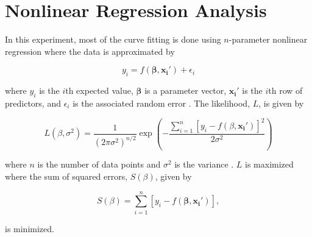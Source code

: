 
\section{Nonlinear Regression Analysis}\label{nonlinearregressionanalysis}
In this experiment, most of the curve fitting is done using $n$-parameter nonlinear regression where the data is approximated by

\begin{equation}
\label{nonlinfit}
y_{i}=f(\mathbf{\beta},\mathbf{x_{i}'})+\epsilon_{i}
\end{equation}

where $y_{i}$ is the $i$th expected value, $\mathbf{\beta}$ is a parameter vector, $\mathbf{x_{i}'}$ is the $i$th row of predictors, and $\epsilon_{i}$ is the associated random error \cite{bates}.  The likelihood, $L$, is given by 

\begin{equation}
\label{likelihood}
L(\beta,\sigma^{2})=\frac{1}{(2\pi\sigma^{2})^{n/2}}\exp(-\frac{\sum_{i=1}^{n}[y_{i}-f(\beta,\mathbf{x_{i}'})]^{2}}{2\sigma^{2}})
\end{equation}

where $n$ is the number of data points and $\sigma^{2}$ is the variance \cite{bates}. $L$ is maximized where the sum of squared errors, $S(\beta)$, given by \cite{bates}

\begin{equation}
\label{sse}
S(\beta) = \sum_{i=1}^{n}[y_{i}-f(\mathbf{\beta},\mathbf{x_{i}'})],
\end{equation}

is minimized.